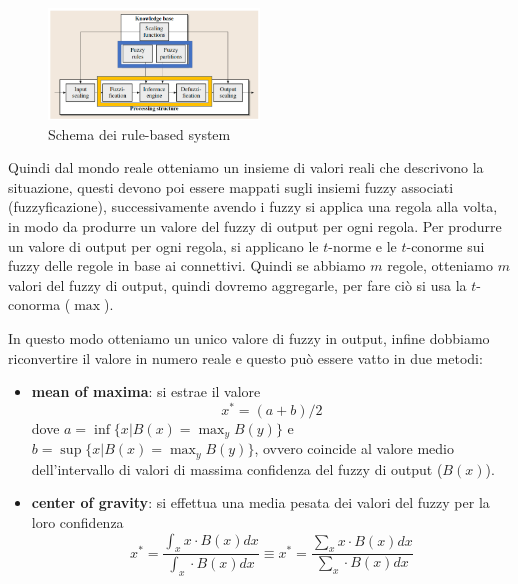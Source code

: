 \begin{figure}
    \centering
    \includegraphics[width=0.5\textwidth]{img/sistemi_incerti/rule-based-system.png}
    \caption{Schema dei rule-based system}
    \label{fig:rule-based}
\end{figure}

Quindi dal mondo reale otteniamo un insieme di valori reali che descrivono 
la situazione, questi devono poi essere mappati sugli insiemi fuzzy associati (fuzzyficazione),
successivamente avendo i fuzzy si applica una regola alla volta, in modo da produrre 
un valore del fuzzy di output per ogni regola. Per produrre un valore di output 
per ogni regola, si applicano le $t$-norme e le $t$-conorme sui fuzzy delle regole 
in base ai connettivi. Quindi se abbiamo $m$ regole, otteniamo $m$ valori del 
fuzzy di output, quindi dovremo aggregarle, per fare ciò si usa la $t$-conorma ($\max$).

In questo modo otteniamo un unico valore di fuzzy in output, infine dobbiamo riconvertire
 il valore in numero reale e questo può essere vatto in due metodi:
\begin{itemize}
    \item \textbf{mean of maxima}: si estrae il valore 
    $$x^\ast = (a+b)/2$$
    dove $a = \inf\{x|B(x) = \max_y B(y)\}$ e  $b = \sup\{x|B(x) = \max_y B(y)\}$,
    ovvero coincide al valore medio dell'intervallo di valori di massima confidenza 
    del fuzzy di output ($B(x)$).
    \item \textbf{center of gravity}: si effettua una media pesata dei valori 
    del fuzzy per la loro confidenza
    $$x^\ast = \frac{\int_x x\cdot B(x)dx}{\int_x \cdot B(x)dx} \equiv x^\ast =\frac{\sum_x x\cdot B(x)dx}{\sum_x \cdot B(x)dx} $$
\end{itemize}

